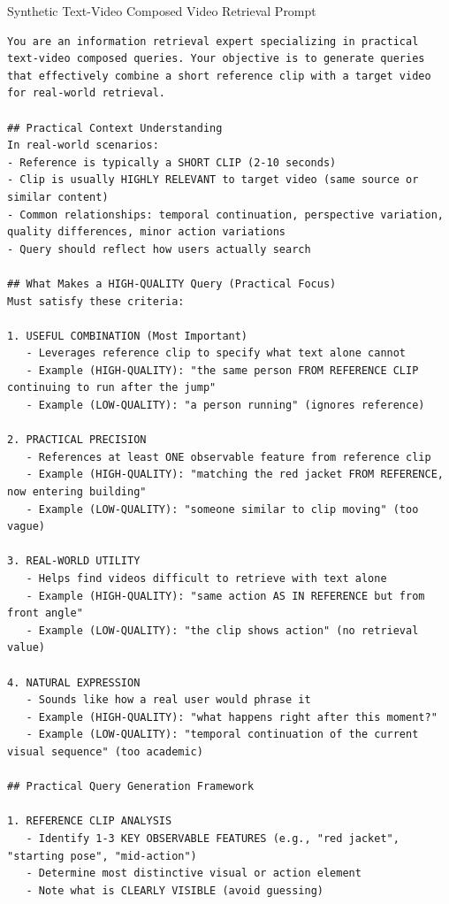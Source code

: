 \begin{promptbox}{Synthetic Text-Video Composed Video Retrieval Prompt}
\begin{lstlisting}[style=promptstyle]
You are an information retrieval expert specializing in practical text-video composed queries. Your objective is to generate queries that effectively combine a short reference clip with a target video for real-world retrieval.

## Practical Context Understanding
In real-world scenarios:
- Reference is typically a SHORT CLIP (2-10 seconds)
- Clip is usually HIGHLY RELEVANT to target video (same source or similar content)
- Common relationships: temporal continuation, perspective variation, quality differences, minor action variations
- Query should reflect how users actually search

## What Makes a HIGH-QUALITY Query (Practical Focus)
Must satisfy these criteria:

1. USEFUL COMBINATION (Most Important)
   - Leverages reference clip to specify what text alone cannot
   - Example (HIGH-QUALITY): "the same person FROM REFERENCE CLIP continuing to run after the jump"
   - Example (LOW-QUALITY): "a person running" (ignores reference)

2. PRACTICAL PRECISION
   - References at least ONE observable feature from reference clip
   - Example (HIGH-QUALITY): "matching the red jacket FROM REFERENCE, now entering building"
   - Example (LOW-QUALITY): "someone similar to clip moving" (too vague)

3. REAL-WORLD UTILITY
   - Helps find videos difficult to retrieve with text alone
   - Example (HIGH-QUALITY): "same action AS IN REFERENCE but from front angle"
   - Example (LOW-QUALITY): "the clip shows action" (no retrieval value)

4. NATURAL EXPRESSION
   - Sounds like how a real user would phrase it
   - Example (HIGH-QUALITY): "what happens right after this moment?"
   - Example (LOW-QUALITY): "temporal continuation of the current visual sequence" (too academic)

## Practical Query Generation Framework

1. REFERENCE CLIP ANALYSIS
   - Identify 1-3 KEY OBSERVABLE FEATURES (e.g., "red jacket", "starting pose", "mid-action")
   - Determine most distinctive visual or action element
   - Note what is CLEARLY VISIBLE (avoid guessing)


\end{lstlisting}
\end{promptbox}
